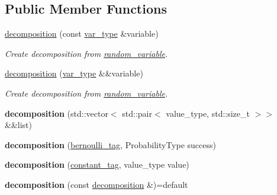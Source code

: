 \subsection*{Public Member Functions}
\begin{DoxyCompactItemize}
\item 
\mbox{\hyperlink{classdice_1_1decomposition_a0ec6a2cfb52048bd1e553d53627aec2c}{decomposition}} (const \mbox{\hyperlink{classdice_1_1random__variable}{var\+\_\+type}} \&variable)
\begin{DoxyCompactList}\small\item\em Create decomposition from \mbox{\hyperlink{classdice_1_1random__variable}{random\+\_\+variable}}. \end{DoxyCompactList}\item 
\mbox{\hyperlink{classdice_1_1decomposition_a1c0f335542198fe9f6ca6d0a0c2a4de0}{decomposition}} (\mbox{\hyperlink{classdice_1_1random__variable}{var\+\_\+type}} \&\&variable)
\begin{DoxyCompactList}\small\item\em Create decomposition from \mbox{\hyperlink{classdice_1_1random__variable}{random\+\_\+variable}}. \end{DoxyCompactList}\item 
\mbox{\label{classdice_1_1decomposition_ad44e439c795cfd2c881602cea4ed99cb}} 
{\bfseries decomposition} (std\+::vector$<$ std\+::pair$<$ value\+\_\+type, std\+::size\+\_\+t $>$$>$ \&\&list)
\item 
\mbox{\label{classdice_1_1decomposition_af0af395a0462070a80bff39ed6a8e4e5}} 
{\bfseries decomposition} (\mbox{\hyperlink{classdice_1_1bernoulli__tag}{bernoulli\+\_\+tag}}, Probability\+Type success)
\item 
\mbox{\label{classdice_1_1decomposition_a96000e52a4ac3c777ccae25eced198cf}} 
{\bfseries decomposition} (\mbox{\hyperlink{classdice_1_1constant__tag}{constant\+\_\+tag}}, value\+\_\+type value)
\item 
\mbox{\label{classdice_1_1decomposition_abe2edcf9ec724d7300cefa21132dd8c1}} 
{\bfseries decomposition} (const \mbox{\hyperlink{classdice_1_1decomposition}{decomposition}} \&)=default
\item 
\mbox{\label{classdice_1_1decomposition_a08552602e4e040eb8188675a886a3dd5}} 
$$
\end{DoxyCompactItemize}
